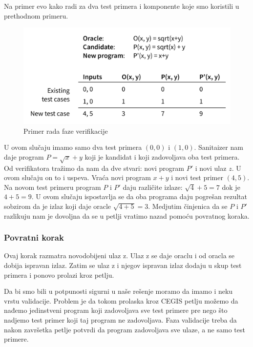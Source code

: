 Na primer evo kako radi za dva test primera i komponente koje smo koristili u prethodnom primeru.

\begin{figure}[h!]
\begin{center}
\includegraphics[scale=0.6]{resources/oracle-table.png}
\end{center}
\caption{Primer rada faze verifikacije}
\label{fig:oraclePrimer1}
\end{figure}


U ovom slučaju imamo samo dva test primera $(0,0)$ i $(1,0)$. Sanitaizer nam daje program $P=\sqrt{x}+y$ koji je kandidat i koji zadovoljava oba test primera. Od verifikatora tražimo da nam da dve stvari: novi program $P'$ i novi ulaz $z$. U ovom slučaju on to i uspeva. Vraća novi program $x+y$ i novi test primer $(4,5)$. Na novom test primeru program $P$ i $P'$ daju različite izlaze: $\sqrt{4}+5=7$ dok je $4+5=9$. U ovom slučaju ispostavlja se da oba programa daju pogrešan rezultat sobzirom da je izlaz koji daje oracle $\sqrt{4+5}=3$. Medjutim činjenica da se $P$ i $P'$ razlikuju nam je dovoljna da se u petlji vratimo nazad pomoću povratnog koraka.

\subsubsection*{Povratni korak}


Ovaj korak razmatra novodobijeni ulaz z. Ulaz z se daje oraclu i od oracla se dobija ispravan izlaz. Zatim se ulaz z i njegov ispravan izlaz dodaju u skup test primera i ponovo prolazi kroz petlju.

Da bi smo bili u potpunosti sigurni u naše rešenje moramo da imamo i neku vrstu validacije. Problem je da tokom prolaska kroz CEGIS petlju možemo da nađemo jedinstveni program koji zadovoljava sve test primere pre nego što nadjemo test primer koji taj program ne zadovoljava. Faza validacije treba da nakon završetka petlje potvrdi da program zadovoljava sve ulaze, a ne samo test primere.

